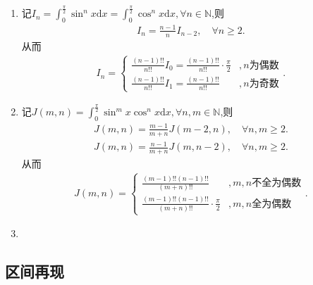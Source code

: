 \documentclass[../../main.tex]{subfiles}
\begin{document}
\begin{theorem}[点火公式]\label{theorem:点火公式}
\begin{enumerate}
\item 记$I_n=\int_0^{\frac{\pi}{2}}\sin^n x\mathrm{d}x=\int_0^{\frac{\pi}{2}}\cos^n x\mathrm{d}x,\forall n\in \mathbb{N}$,则
\begin{align*}
I_n=\frac{n-1}{n}I_{n-2},\quad \forall n\geqslant 2.
\end{align*}
从而
\begin{align}\label{eq:点火公式1}
I_n=
\begin{cases}
\frac{(n-1)!!}{n!!}I_0=\frac{(n-1)!!}{n!!}\cdot \frac{\pi}{2}&,n\text{为偶数}\\
\frac{(n-1)!!}{n!!}I_1=\frac{(n-1)!!}{n!!}&,n\text{为奇数}
\end{cases}.
\end{align}

\item 记$J(m,n)=\int_0^{\frac{\pi}{2}}\sin^m x\cos^n x\mathrm{d}x,\forall n,m\in \mathbb{N}$,则
\begin{align*}
J(m,n)=\frac{m-1}{m+n}J(m-2,n),\quad \forall n,m\geqslant 2.
\end{align*}
\begin{align*}
J(m,n)=\frac{n-1}{m+n}J(m,n-2),\quad \forall n,m\geqslant 2.
\end{align*}
从而
\begin{align}\label{eq:点火公式2}
J(m,n)=
\begin{cases}
\frac{(m-1)!!(n-1)!!}{(m+n)!!}&,m,n\text{不全为偶数}\\
\frac{(m-1)!!(n-1)!!}{(m+n)!!}\cdot \frac{\pi}{2}&,m,n\text{全为偶数}
\end{cases}.
\end{align}

\item 
\end{enumerate}
\end{theorem}





\subsection{区间再现}
\end{document}
